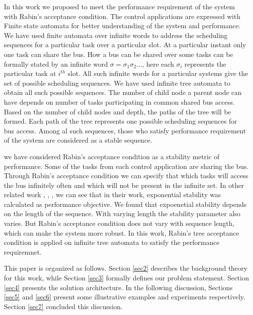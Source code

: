 In this work we proposed to meet the performance requirement of the system with Rabin's
acceptance condition. The control applications are expressed with Finite state automata for 
better understanding of the system and performance. We have used finite automata over 
infinite words to address the scheduling sequences for a particular task over 
a particular slot. At a particular instant only one task can share the bus. How a bus
can be shared over some tasks can be formally stated by an infinite word $\sigma = 
\sigma_1 \sigma_2 \dots$, here each $\sigma_i$ represents the particular task at
$i^{th}$ slot. All such infinite words for a particular systems give the set of possible scheduling
sequences. We have used infinite tree automata to obtain all such possible sequences. The 
number of child node a parent node can have depends on number of tasks participating in common 
shared bus access. Based on the number of child nodes and depth, the paths of the 
tree will be formed. Each path of the tree represents one possible scheduling sequences
for bus access. Among al such sequences, those who satisfy performance requirement 
of the system are considered as a stable sequence.

we have considered Rabin's acceptance condition as a stability metric of performance.
Some of the tasks from each control application are sharing the bus. Through Rabin's
acceptance condition we can specify that which tasks will access the bus infinitely often
and which will not be present in the infinite set. In other related work \cite{WeissA07},
\cite{AlurW08}, \cite{WeissFAA09}, \cite{GhoshMDHD16} we can see that in their work,
exponential stability was calculated as performance objective. We found that 
expoenetial stability depends on the length of the sequence. With varying length the 
stability parameter also varies. But Rabin's acceptance condition does not vary with
sequence length, which can make the system more robust. In this work, Rabin's tree
acceptance condition is applied on infinite tree automata to satisfy the performance
requiremnet.


This paper is organized as follows. Section \ref{sec2} describes the background theory
for this work, while Section \ref{sec3} formally defines our problem statement.
Section \ref{sec4} presents the solution architecture. In the following discussion,
Sections \ref{sec5} and \ref{sec6} present some illustrative examples and experiments
respectively. Section \ref{sec7} concluded this discussion.


